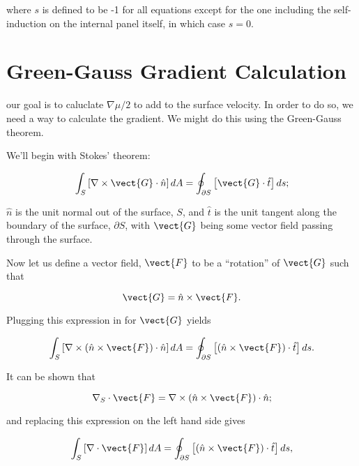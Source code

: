 where \(s\) is defined to be -1 for all equations except for the one including the self-induction on the internal panel itself, in which case \(s=0\).


\section{Green-Gauss Gradient Calculation}

our goal is to caluclate \(\nabla \mu / 2\) to add to the surface velocity.
In order to do so, we need a way to calculate the gradient.  We might do this using the Green-Gauss theorem.

We'll begin with Stokes' theorem:

\begin{equation}
    \int_S \left[\nabla \times \vect{G} \cdot \hat{n}\right] dA = \oint_{\partial S}  \left[\vect{G}\cdot \hat{t}\right]ds;
\end{equation}

\where \(\hat{n}\) is the unit normal out of the surface, \(S\), and \(\hat{t}\) is the unit tangent along the boundary of the surface, \(\partial S\), with \(\vect{G}\) being some vector field passing through the surface.

Now let us define a vector field, \(\vect{F}\) to be a ``rotation'' of \(\vect{G}\) such that

\begin{equation}
    \vect{G} = \hat{n} \times \vect{F}.
\end{equation}

\noindent Plugging this expression in for \(\vect{G}\) yields

\begin{equation}
    \int_S \left[\nabla \times (\hat{n} \times \vect{F}) \cdot \hat{n}\right] dA = \oint_{\partial S}  \left[(\hat{n} \times \vect{F})\cdot \hat{t}\right]ds.
\end{equation}

\noindent It can be shown that

\begin{equation}
    \nabla_S \cdot \vect{F} = \nabla \times \left( \hat{n} \times \vect{F}\right)\cdot \hat{n};
\end{equation}

\noindent and replacing this expression on the left hand side gives


\begin{equation}
    \int_S \left[\nabla \cdot \vect{F} \right] dA = \oint_{\partial S}  \left[(\hat{n} \times \vect{F})\cdot \hat{t}\right]ds,
\end{equation}

